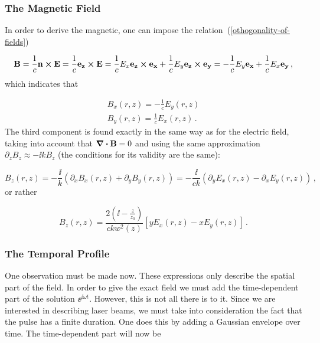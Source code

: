 \documentclass[12pt, class=report, crop=false]{standalone}
\begin{document}
\subsubsection{The Magnetic Field}
In order to derive the magnetic, one can impose the relation~(\ref{othogonality-of-fields})

\begin{equation*}
  \vb{B} = \frac{1}{c} \vb{n} \cp\vb{E} = \frac{1}{c} \vb{e_z} \cp\vb{E} = \frac{1}{c} E_x \vb{e_z} \cp\vb{e_x} + \frac{1}{c} E_y \vb{e_z} \cp\vb{e_y} = - \frac{1}{c} E_y \vb{e_x}+\frac{1}{c} E_x \vb{e_y} \,,
\end{equation*}
which indicates that

\begin{subequations}
  \begin{align}
    B_x(r,z) = -\frac{1}{c}E_y(r,z)\\
    B_y(r,z) = \frac{1}{c}E_x(r,z)\,.
  \end{align}
\end{subequations}
The third component is found exactly in the same way as for the electric field, taking into account that \(\div{\vb{B}}=0\) and using the same approximation \(\partial_z B_z \approx -\ii k B_z\) (the conditions for its validity are the same):

\begin{equation}
  B_z (r,z) = - \frac{\ii}{k} \left( \partial_x B_x (r,z) +\partial_y B_y (r,z)\right) = -\frac{\ii}{ck} \left( \partial_y E_x (r,z) - \partial_x E_y (r,z) \right)\,,
\end{equation}
or rather

\begin{equation}
  B_z (r,z) = \frac{2 \left(\ii -\frac{z}{z_0}\right)}{ckw^2 (z)} [yE_x (r,z) -xE_y(r,z)]\,.
\end{equation}

\subsubsection{The Temporal Profile}
One observation must be made now. These expressions only describe the spatial part of the field. In order to give the exact field we must add the time-dependent part of the solution \(\ee^{\ii \omega t}\). However, this is not all there is to it. Since we are interested in describing laser beams, we must take into consideration the fact that the pulse has a finite duration. One does this by adding a Gaussian envelope over time. The time-dependent part will now be
\end{document}
